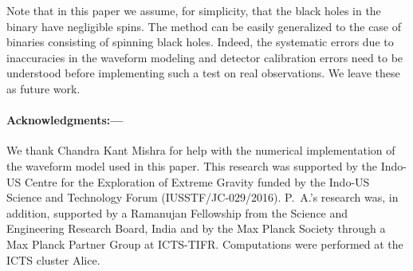 \documentclass[prl,preprintnumbers,twocolumn,eqsecnum,floatfix,a4paper,nofootinbib,superscriptaddress]{revtex4}
\begin{document}
Note that in this paper we assume, for simplicity, that the black holes in the binary have negligible spins. The method can be easily generalized to the case of binaries consisting of spinning black holes. Indeed, the systematic errors due to inaccuracies in the waveform modeling and detector calibration errors need to be understood before implementing such a test on real observations. We leave these as future work. 

\paragraph{Acknowledgments:---}
We thank Chandra Kant Mishra for help with the numerical implementation of the waveform model used in this paper. This research was supported by the Indo-US Centre for the Exploration of Extreme Gravity funded by the Indo-US Science and Technology Forum (IUSSTF/JC-029/2016). P.~A.'s research was, in addition, supported by a Ramanujan Fellowship from the Science and Engineering Research Board, India and by the Max Planck Society through a Max Planck Partner Group at ICTS-TIFR. Computations were performed at the ICTS cluster Alice. 
%


\end{document}
